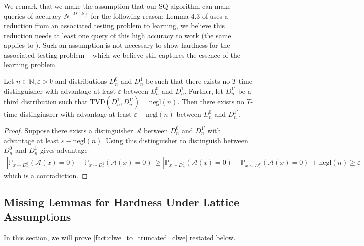 \documentclass{theoretics}
\newcommand{\Paren}[1]{\left(#1\right)}
\newcommand{\Abs}[1]{\left\lvert#1\right\rvert}
\newcommand{\Psymb}{\mathbb{P}}
\newcommand{\N}{\mathbb N}
\newcommand{\cA}{\mathcal A}
\renewcommand{\geq}{\geqslant}
\let\epsilon=\varepsilon
\newcommand{\e}{\epsilon}
\newcommand{\negl}{\mathrm{negl}}
\newcommand{\TVD}[2]{\mathrm{TVD}(#1,#2)}
\begin{document}
We remark that we make the assumption that our SQ algorithm can make queries of accuracy $N^{-\Omega(k)}$ for the following reason:
Lemma 4.3 of \cite{NT22} uses a reduction from an associated testing problem to learning, we believe this reduction needs at least one query of this high accuracy to work (the same applies to \cite{DK22}).
Such an assumption is not necessary to show hardness for the associated testing problem -- which we believe still captures the essence of the learning problem.

\begin{lemma}
    \label{lem:small_tvd_advantage}
    Let $n \in \N, \e > 0$ and distributions $D_n^0$ and $D_n^1$ be such that there exists no $T$-time distinguisher with advantage at least $\e$ between $D_n^0$ and $D_n^1$.
    Further, let $D_n^{1'}$ be a third distribution such that $\TVD{D_n^1}{D_n^{1'}} = \negl(n)$.
    Then there exists no $T$-time distingiusher with advantage at least $\e - \negl(n)$ between $D_n^0$ and $D_n^{1'}$.
\end{lemma}
\begin{proof}
    Suppose there exists a distinguisher $\cA$ between $D_n^0$ and $D_n^{1'}$ with advantage at least $\e - \negl(n)$.
    Using this distinguisher to distinguish between $D_n^0$ and $D_n^1$ gives advantage
    \begin{align*}
        \Abs{\Psymb_{x \sim D_n^0} \Paren{\cA(x) = 0} - \Psymb_{x \sim D_n^1} \Paren{\cA(x) = 0}} \geq \Abs{\Psymb_{x \sim D_n^0} \Paren{\cA(x) = 0} - \Psymb_{x \sim D_n^{1'}} \Paren{\cA(x) = 0}} + \negl(n) \geq \e
    \end{align*}
    which is a contradiction.
\end{proof}

\subsection{Missing Lemmas for Hardness Under Lattice Assumptions}
\label{sec:missing_lemmas_crypto}

In this section, we will prove \cref{fact:clwe_to_truncated_clwe} restated below.
\clwetotruncatedclwe*
\end{document}
